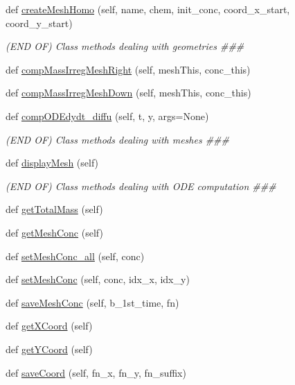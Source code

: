 \begin{DoxyCompactItemize}
\item 
def \hyperlink{classcomp_1_1Comp_ae966c14ad17e0440715d1958885af6a7}{create\+Mesh\+Homo} (self, name, chem, init\+\_\+conc, coord\+\_\+x\+\_\+start, coord\+\_\+y\+\_\+start)
\begin{DoxyCompactList}\small\item\em (E\+ND OF) Class methods dealing with geometries \#\#\# \end{DoxyCompactList}\item 
def \hyperlink{classcomp_1_1Comp_a0f93a3308637381e7342a2a7497d174d}{comp\+Mass\+Irreg\+Mesh\+Right} (self, mesh\+This, conc\+\_\+this)
\item 
def \hyperlink{classcomp_1_1Comp_a7b78ad68606fdf55c38c3de6d5a67570}{comp\+Mass\+Irreg\+Mesh\+Down} (self, mesh\+This, conc\+\_\+this)
\item 
def \hyperlink{classcomp_1_1Comp_af33e252fda921dadb0e80c825e48e386}{comp\+O\+D\+Edydt\+\_\+diffu} (self, t, y, args=None)
\begin{DoxyCompactList}\small\item\em (E\+ND OF) Class methods dealing with meshes \#\#\# \end{DoxyCompactList}\item 
def \hyperlink{classcomp_1_1Comp_ad2c0555c16dc7b5bf639407fa44bfaf7}{display\+Mesh} (self)
\begin{DoxyCompactList}\small\item\em (E\+ND OF) Class methods dealing with O\+DE computation \#\#\# \end{DoxyCompactList}\item 
def \hyperlink{classcomp_1_1Comp_a7b8cd6483a2de95d92a0d5b4d939ca65}{get\+Total\+Mass} (self)
\item 
def \hyperlink{classcomp_1_1Comp_ac100eb9f8d55df5f9f761cbe45a58024}{get\+Mesh\+Conc} (self)
\item 
def \hyperlink{classcomp_1_1Comp_aa26bcef2041be06676b2ce772bb3a4e5}{set\+Mesh\+Conc\+\_\+all} (self, conc)
\item 
def \hyperlink{classcomp_1_1Comp_ad6b532a1d5c1aa95b9a88124a5b5609d}{set\+Mesh\+Conc} (self, conc, idx\+\_\+x, idx\+\_\+y)
\item 
def \hyperlink{classcomp_1_1Comp_afe675826a85b99ab6dc5de7ed02a2e0d}{save\+Mesh\+Conc} (self, b\+\_\+1st\+\_\+time, fn)
\item 
def \hyperlink{classcomp_1_1Comp_a61ca5ccfbb7e0ee1244931e78eb5a35d}{get\+X\+Coord} (self)
\item 
def \hyperlink{classcomp_1_1Comp_ab61436b8f65a7f8c45fb554e412cdfa3}{get\+Y\+Coord} (self)
\item 
def \hyperlink{classcomp_1_1Comp_a0268c9629d4839526c1e81114adc2408}{save\+Coord} (self, fn\+\_\+x, fn\+\_\+y, fn\+\_\+suffix)
\end{DoxyCompactItemize}
